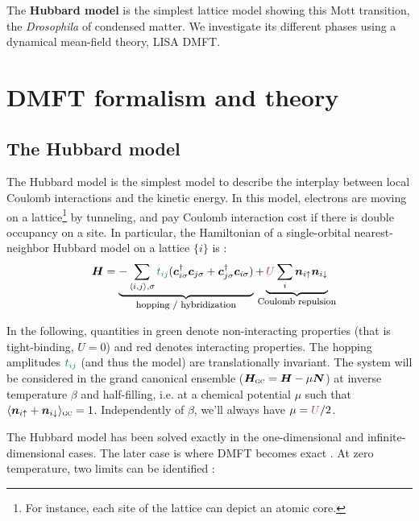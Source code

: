 \documentclass[reprint,amsmath,amssymb,aps,pra]{revtex4-2}
\newcommand{\tmbf}[1]{\ensuremath{\boldsymbol{#1}}}
\newcommand{\tmname}[1]{\textsc{#1}}
\begin{document}
The \textbf{Hubbard model} is the simplest lattice model showing this Mott transition, the \emph{Drosophila} of condensed matter. We investigate its different phases using a dynamical mean-field theory, LISA DMFT.

\section{DMFT formalism and theory}

\subsection{The Hubbard model}

The Hubbard model is the simplest model to describe the interplay between
local Coulomb interactions and the kinetic energy. In this model, electrons are moving on a lattice\footnote{For instance, each site of the lattice can depict an atomic core.} by tunneling, and pay Coulomb interaction cost if there is double occupancy on a site. In particular, the Hamiltonian of a single-orbital nearest-neighbor Hubbard model on a lattice $\{ i \}$ is :
\begin{equation}
  \tmbf{H} = \underbrace{- \sum_{\langle i, j \rangle, \sigma}
  {\color[HTML]{008080}t_{i j}}  (\tmbf{c}_{i \sigma}^{\dag}
  \tmbf{c}_{j \sigma} +\tmbf{c}_{j \sigma}^{\dag} \tmbf{c}_{i
  \sigma})}_{\text{\footnotesize hopping / hybridization}} + \underbrace{{\color[HTML]{BF4040}U}  \sum_i \tmbf{n}_{i
  \uparrow} \tmbf{n}_{i \downarrow}}_{\clap{\text{\footnotesize Coulomb repulsion}}} \label{Hubbard-model}
\end{equation}

In the following, quantities in {\color[HTML]{008080}green} denote non-interacting properties (that is tight-binding, $U=0$) and {\color[HTML]{BF4040}red} denotes interacting properties. The hopping amplitudes ${\color[HTML]{008080}t_{i j}}$ (and thus the model) are translationally invariant. The system will be considered in the grand canonical ensemble ($\tmbf{H}_{\mathrm{{\tmname{gc}}}} = \tmbf{H} - \mu \tmbf{N}$) at inverse temperature $\beta$ and half-filling, i.e. at a chemical potential $\mu$ such that $\langle \tmbf{n}_{i\uparrow} +\tmbf{n}_{i\downarrow} \rangle_{\mathrm{{\tmname{gc}}}} = 1$. Independently of $\beta$, we'll always have $\mu = {\color[HTML]{BF4040}U} / 2$.

The Hubbard model has been solved exactly in the one-dimensional and infinite-dimensional cases. The later case is where DMFT becomes exact \cite{Georges1996}. At zero temperature, two limits can be identified :
\end{document}
